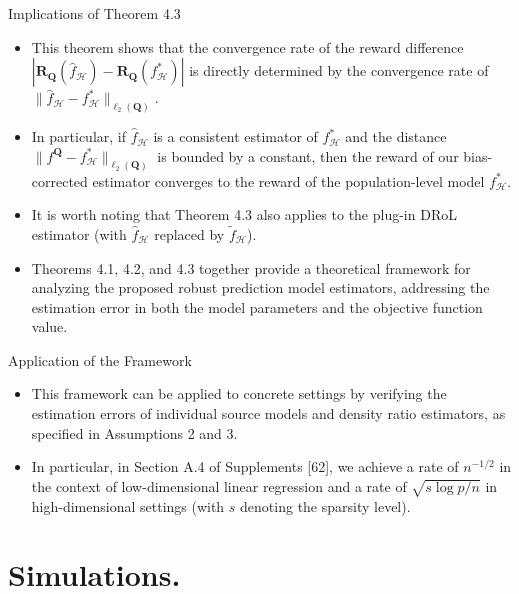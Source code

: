 \documentclass{beamer}
\begin{document}
\begin{frame}{Implications of Theorem 4.3}
    \begin{itemize}
        \item This theorem shows that the convergence rate of the reward difference $|\mathbf{R_{Q}}({\widehat{f}}_{\mathcal{H}}) - \mathbf{R}_{\mathbf{Q}}(f_{\mathcal{H}}^{*})|$ is directly determined by the convergence rate of $\|\widehat{f}_{\mathcal{H}} - f_{\mathcal{H}}^{*}\|_{\ell_{2}(\mathbf{Q})}$.
        \item In particular, if $\widehat{f}_{\mathcal{H}}$ is a consistent estimator of $f_{\mathcal{H}}^{*}$ and the distance $\|f^{\mathbf{Q}} - f_{\mathcal{H}}^{*}\|_{\ell_{2}({\mathbf{Q}})}$ is bounded by a constant, then the reward of our bias-corrected estimator converges to the reward of the population-level model $f_{\mathcal{H}}^{*}$.
        \item It is worth noting that Theorem 4.3 also applies to the plug-in DRoL estimator (with $\widehat{f}_{\mathcal{H}}$ replaced by $\tilde{f}_{\mathcal{H}}$).
        \item Theorems 4.1, 4.2, and 4.3 together provide a theoretical framework for analyzing the proposed robust prediction model estimators, addressing the estimation error in both the model parameters and the objective function value.
    \end{itemize}
\end{frame}

\begin{frame}{Application of the Framework}
    \begin{itemize}
        \item This framework can be applied to concrete settings by verifying the estimation errors of individual source models and density ratio estimators, as specified in Assumptions 2 and 3.
        \item In particular, in Section A.4 of Supplements [62], we achieve a rate of $n^{-1/2}$ in the context of low-dimensional linear regression and a rate of $\sqrt{s \log p / n}$ in high-dimensional settings (with $s$ denoting the sparsity level).
    \end{itemize}
\end{frame}

\section{Simulations.}
\end{document}
